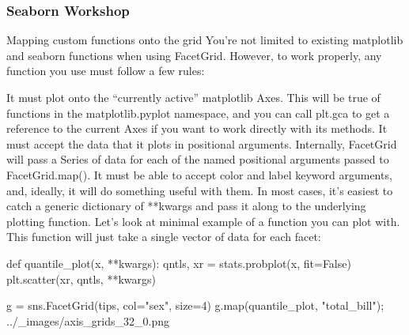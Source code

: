 \begin{frame}[fragile]
\frametitle{Seaborn Workshop}
\large

Mapping custom functions onto the grid
You’re not limited to existing matplotlib and seaborn functions when using FacetGrid. However, to work properly, any function you use must follow a few rules:

It must plot onto the “currently active” matplotlib Axes. This will be true of functions in the matplotlib.pyplot namespace, and you can call plt.gca to get a reference to the current Axes if you want to work directly with its methods.
It must accept the data that it plots in positional arguments. Internally, FacetGrid will pass a Series of data for each of the named positional arguments passed to FacetGrid.map().
It must be able to accept color and label keyword arguments, and, ideally, it will do something useful with them. In most cases, it’s easiest to catch a generic dictionary of **kwargs and pass it along to the underlying plotting function.
Let’s look at minimal example of a function you can plot with. This function will just take a single vector of data for each facet:

def quantile_plot(x, **kwargs):
    qntls, xr = stats.probplot(x, fit=False)
    plt.scatter(xr, qntls, **kwargs)

g = sns.FacetGrid(tips, col="sex", size=4)
g.map(quantile_plot, "total_bill");
../_images/axis_grids_32_0.png

\end{frame}
